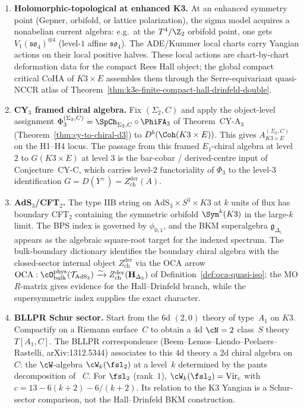 \begin{enumerate}[label=\textbf{Route \arabic*.}, leftmargin=*]
 \item \textbf{Holomorphic-topological at enhanced K3.} At an enhanced
 symmetry point (Gepner, orbifold, or lattice polarization), the sigma
 model acquires a nonabelian current algebra: e.g.\ at the $T^4/\Z_2$
 orbifold point, one gets $V_1(\mathfrak{so}_4)^{\oplus 4}$ (level-$1$
 affine $\mathfrak{so}_4$). The ADE/Kummer local charts carry Yangian
 actions on their local positive halves. These local actions are
 chart-by-chart deformation data for the compact Rees Hall object; the
 global compact critical CoHA of $K3 \times E$ assembles them through
 the Serre-equivariant quasi-NCCR atlas of
 Theorem~\ref{thm:k3e-finite-compact-hall-drinfeld-double}.

 \item \textbf{CY$_3$ framed chiral algebra.} Fix $(\Sigma_2,C)$ and
 apply the object-level assignment
 $\Phi_3^{(\Sigma_2,C)}=\SpCh_{\Sigma_2,C}\circ\PhiFA_3$ of
 Theorem~CY-A$_3$ (Theorem~\ref{thm:cy-to-chiral-d3}) to
 $D^b(\Coh(K3 \times E))$. This gives
 $A_{K3 \times E}^{(\Sigma_2, C)}$ on the H1--H4 locus. The passage
 from this framed $E_1$-chiral algebra at level $2$ to
 $G(K3 \times E)$ at level $3$ is the bar-cobar / derived-centre
 input of Conjecture~CY-C, which carries level-$2$ functoriality of
 $\Phi_3$ to the level-$3$ identification $G = D(Y^+) = Z^{\mathrm{der}}_{\mathrm{ch}}(A)$.

 \item \textbf{AdS$_3$/CFT$_2$.} The type IIB string on
 $\mathrm{AdS}_3 \times S^3 \times K3$ at $k$ units of flux has boundary
 CFT$_2$ containing the symmetric orbifold $\Sym^k(K3)$ in the large-$k$
 limit. The BPS index is governed by $\phi_{0,1}$, and the BKM
 superalgebra $\mathfrak{g}_{\Delta_5}$ appears as the algebraic
 square-root target for the indexed spectrum. The bulk-boundary
 dictionary identifies the boundary chiral algebra with the
 closed-sector internal object $Z^{\mathrm{der}}_{\mathrm{ch}}$ via
 the OCA arrow
 $\mathrm{OCA} : \cO^{\mathrm{phys}}_{\mathrm{bulk}}(\mathcal T_{\mathrm{AdS}_3}) \xrightarrow{\sim}
 Z^{\mathrm{der}}_{\mathrm{ch}}(\mathbf H_{\Delta_5})$ of
 Definition~\ref{def:oca-quasi-iso}; the MO $R$-matrix gives
 evidence for the Hall--Drinfeld branch, while the supersymmetric
 index supplies the exact character.

 \item \textbf{BLLPR Schur sector.} Start from the $6$d $(2,0)$ theory of
 type~$A_1$ on $K3$. Compactify on a Riemann surface~$C$ to obtain a
 $4$d $\cN = 2$ class~$S$ theory $T[A_1, C]$. The BLLPR correspondence
 (Beem--Lemos--Liendo--Peelaers--Rastelli, arXiv:1312.5344) associates to
 this $4$d theory a $2$d chiral algebra on~$C$: the $\cW$-algebra
 $\cW_k(\fsl_2)$ at a level~$k$ determined by the pants decomposition of
~$C$. For $\fsl_2$ (rank~$1$),
 $\cW_k(\fsl_2) = \mathrm{Vir}_{c}$ with
 $c = 13 - 6(k+2) - 6/(k+2)$. Its relation to the K3 Yangian is a
 Schur-sector comparison, not the Hall--Drinfeld BKM construction.
\end{enumerate}

